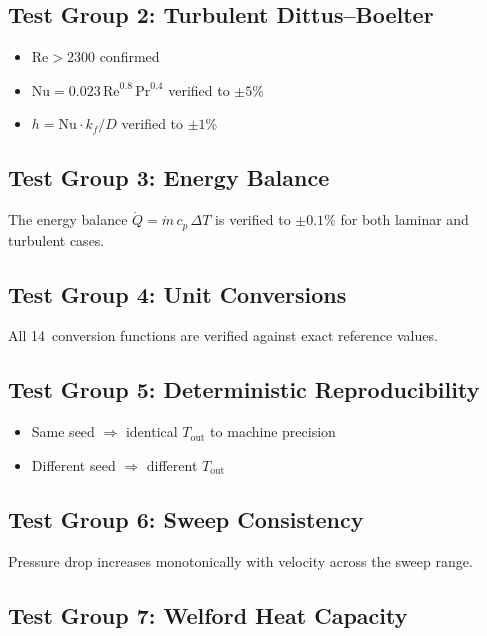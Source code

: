\documentclass[11pt]{article}
\begin{document}
\subsection{Test Group 2: Turbulent Dittus--Boelter}

\begin{itemize}
  \item $\mathrm{Re} > 2300$ confirmed
  \item $\mathrm{Nu} = 0.023 \, \mathrm{Re}^{0.8} \, \mathrm{Pr}^{0.4}$ verified to $\pm 5\%$
  \item $h = \mathrm{Nu} \cdot k_f / D$ verified to $\pm 1\%$
\end{itemize}

\subsection{Test Group 3: Energy Balance}

The energy balance $\dot{Q} = \dot{m} \, c_p \, \Delta T$ is verified to
$\pm 0.1\%$ for both laminar and turbulent cases.

\subsection{Test Group 4: Unit Conversions}

All 14~conversion functions are verified against exact reference values.

\subsection{Test Group 5: Deterministic Reproducibility}

\begin{itemize}
  \item Same seed $\Rightarrow$ identical $T_{\text{out}}$ to machine precision
  \item Different seed $\Rightarrow$ different $T_{\text{out}}$
\end{itemize}

\subsection{Test Group 6: Sweep Consistency}

Pressure drop increases monotonically with velocity across the sweep range.

\subsection{Test Group 7: Welford Heat Capacity}
\end{document}
